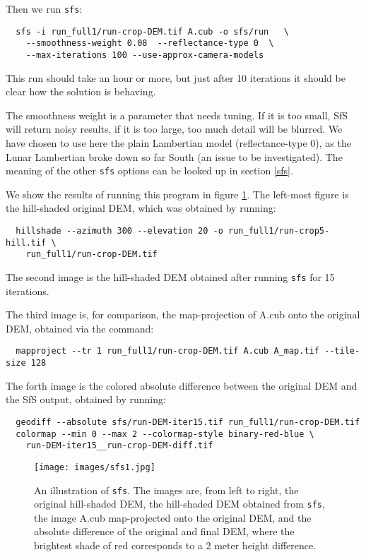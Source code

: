 Then we run \texttt{sfs}:
\begin{verbatim}
  sfs -i run_full1/run-crop-DEM.tif A.cub -o sfs/run   \
    --smoothness-weight 0.08  --reflectance-type 0  \
    --max-iterations 100 --use-approx-camera-models
\end{verbatim}
This run should take an hour or more, but just after 10 iterations
it should be clear how the solution is behaving.

The smoothness weight is a parameter that needs tuning. If it is too
small, SfS will return noisy results, if it is too large, too much
detail will be blurred. We have chosen to use here the plain Lambertian
model (reflectance-type 0), as the Lunar Lambertian broke down so far
South (an issue to be investigated). The meaning of the other
\texttt{sfs} options can be looked up in section \ref{sfs}.

We show the results of running this program in figure
\ref{fig:sfs1}. The left-most figure is the hill-shaded original DEM,
which was obtained by running:
\begin{verbatim}
  hillshade --azimuth 300 --elevation 20 -o run_full1/run-crop5-hill.tif \
    run_full1/run-crop-DEM.tif
\end{verbatim}
The second image is the hill-shaded DEM obtained after running
\texttt{sfs} for 15 iterations.

The third image is, for comparison, the map-projection of A.cub onto the
original DEM, obtained via the command:
\begin{verbatim}
  mapproject --tr 1 run_full1/run-crop-DEM.tif A.cub A_map.tif --tile-size 128
\end{verbatim}
The forth image is the colored absolute difference between the original
DEM and the SfS output, obtained by running:
\begin{verbatim}
  geodiff --absolute sfs/run-DEM-iter15.tif run_full1/run-crop-DEM.tif
  colormap --min 0 --max 2 --colormap-style binary-red-blue \
    run-DEM-iter15__run-crop-DEM-diff.tif
\end{verbatim}
\begin{figure}[h!]
\begin{center}
\texttt{[image: images/sfs1.jpg]}
\caption[sfs]{An illustration of \texttt{sfs}. The images are, from
  left to right, the original hill-shaded DEM, the hill-shaded DEM obtained
from \texttt{sfs}, the image A.cub map-projected onto the original DEM,
and the absolute difference of the original and final DEM, where the brightest
shade of red corresponds to a 2 meter height difference.}
\label{fig:sfs1}
\end{center}
\end{figure}

